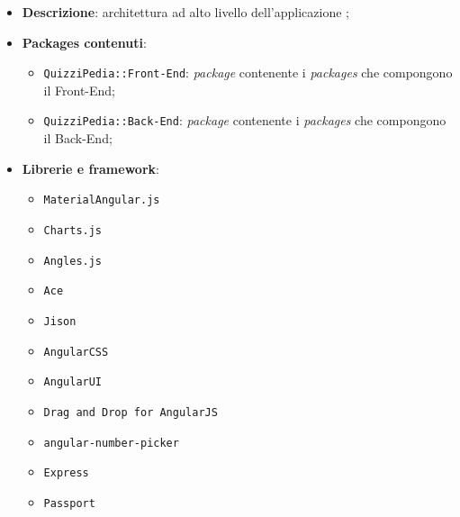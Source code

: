 \begin{itemize}
	\item \textbf{Descrizione}: architettura ad alto livello dell'applicazione \progetto;
	\item \textbf{Packages contenuti}:
	\begin{itemize}
		\item \texttt{QuizziPedia::Front-End}: \textit{package} contenente i \textit{packages} che compongono il Front-End;
		\item \texttt{QuizziPedia::Back-End}: \textit{package} contenente i \textit{packages} che compongono il Back-End;
	\end{itemize}
	\item \textbf{Librerie e framework}:
	\begin{itemize}
		\item \texttt{MaterialAngular.js}
		\item \texttt{Charts.js}
		\item \texttt{Angles.js}
		\item \texttt{Ace}
		\item \texttt{Jison}
		\item \texttt{AngularCSS}
		\item \texttt{AngularUI}
		\item \texttt{Drag and Drop for AngularJS}
		\item \texttt{angular-number-picker}
		\item \texttt{Express}
		\item \texttt{Passport}
	\end{itemize}
\end{itemize}
